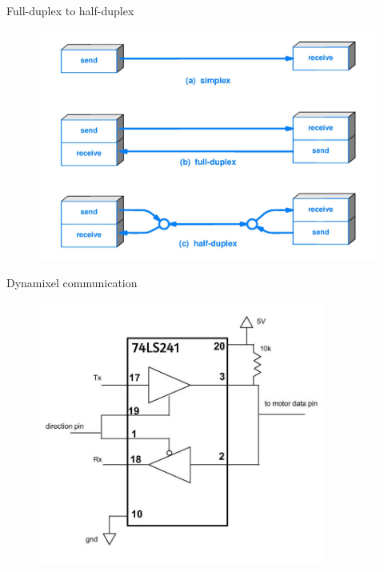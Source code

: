 \documentclass{beamer}
\begin{document}
\begin{frame}{Full-duplex to half-duplex }

    \begin{figure}
        \centering
        \includegraphics[width = \textwidth]{img/BBE_Simplex vs Duplex_Transmissions.jpg}
        
    \end{figure}
    
\end{frame}



\begin{frame}{Dynamixel communication}

    \begin{figure}
        \centering
        \includegraphics[width =9.5cm]{img/uart_half-duplex_74LS241.jpg}
        
    \end{figure}
    
\end{frame}
\end{document}
